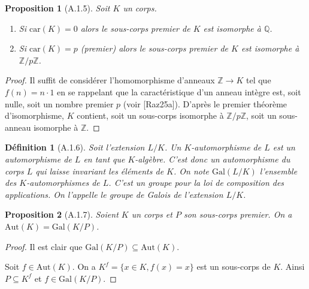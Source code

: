 \documentclass[12pts,a4paper]{report}
\newtheorem{definition}{Définition}
\newtheorem{proposition}{Proposition}
\begin{document}
\begin{proposition}[A.1.5]
Soit \( K \) un corps.
\begin{enumerate}[label=(\alph*)]
\item Si \( \text{car}(K) = 0 \) alors le sous-corps premier de \( K \) est isomorphe à \( \mathbb{Q} \).
\item Si \( \text{car}(K) = p \) (premier) alors le sous-corps premier de \( K \) est isomorphe à \( \mathbb{Z}/p\mathbb{Z} \).
\end{enumerate}
\end{proposition}

\begin{proof}
Il suffit de considérer l'homomorphisme d'anneaux \( \mathbb{Z} \to K \) tel que \( f(n) = n \cdot 1 \) en se rappelant que la caractéristique d'un anneau intègre est, soit nulle, soit un nombre premier \( p \) (voir [Raz25a]). D'après le premier théorème d'isomorphisme, \( K \) contient, soit un sous-corps isomorphe à \( \mathbb{Z}/p\mathbb{Z} \), soit un sous-anneau isomorphe à \( \mathbb{Z} \). \qedhere
\end{proof}

\begin{definition}[A.1.6]
Soit l'extension \( L/K \). Un \( K \)-automorphisme de \( L \) est un automorphisme de \( L \) en tant que \( K \)-algèbre. C'est donc un automorphisme du corps \( L \) qui laisse invariant les éléments de \( K \). On note \( \text{Gal}(L/K) \) l'ensemble des \( K \)-automorphismes de \( L \). C'est un groupe pour la loi de composition des applications. On l'appelle le groupe de Galois de l'extension \( L/K \).
\end{definition}

\begin{proposition}[A.1.7]
Soient \( K \) un corps et \( P \) son sous-corps premier. On a \( \text{Aut}(K) = \text{Gal}(K/P) \).
\end{proposition}

\begin{proof}
Il est clair que \( \text{Gal}(K/P) \subseteq \text{Aut}(K) \).

Soit \( f \in \text{Aut}(K) \). On a \( K^f = \{x \in K, f(x) = x\} \) est un sous-corps de \( K \). Ainsi \( P \subseteq K^f \) et \( f \in \text{Gal}(K/P) \). \qedhere
\end{proof}
\end{document}
